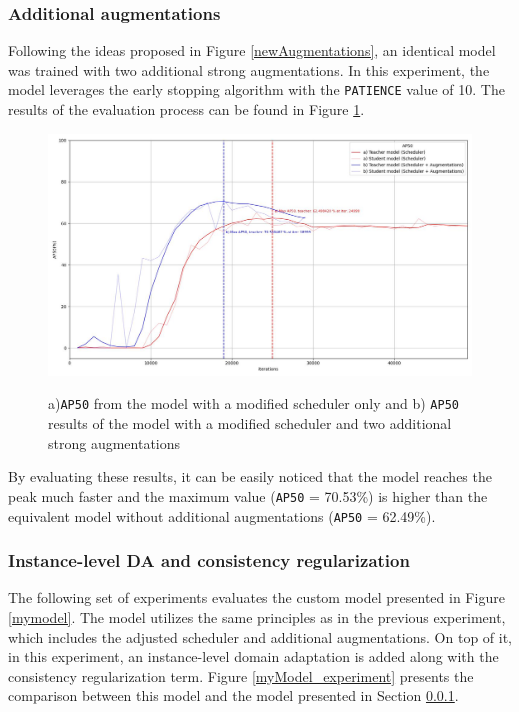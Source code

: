 \documentclass[english, 12pt, a4paper, elec, utf8, a-1b, online]{aaltothesis}
\begin{document}
\subsubsection{Additional augmentations}
\label{augmentations_section} 
Following the ideas proposed in Figure \ref{newAugmentations}, an identical model was trained with two additional strong augmentations. In this experiment, the model leverages the early stopping algorithm with the  \texttt{PATIENCE} value of 10. The results of the evaluation process can be found in Figure \ref{augmentation_experiment}. 
 
\begin{figure}[htb]
	\begin{center}
		\includegraphics[width=14cm]{./AP50_augmentation.jpg}
	\end{center}
	\caption{a)\texttt{AP50} from the model with a modified scheduler only and b) \texttt{AP50} results of the model with a modified scheduler and two additional strong augmentations}
	\begin{center}
		\label{augmentation_experiment}
	\end{center}
\end{figure}
\FloatBarrier  

By evaluating these results, it can be easily noticed that the model reaches the peak much faster and the maximum value (\texttt{AP50} = 70.53\%) is higher than the equivalent model without additional augmentations (\texttt{AP50} = 62.49\%). 


\subsubsection{Instance-level DA and consistency regularization}
The following set of experiments evaluates the custom model presented in Figure \ref{mymodel}. The model utilizes the same principles as in the previous experiment, which includes the adjusted scheduler and additional augmentations. On top of it, in this experiment, an instance-level domain adaptation is added along with the consistency regularization term. Figure \ref{myModel_experiment} presents the comparison between this model and the model presented in Section \ref{augmentations_section}.
\end{document}

